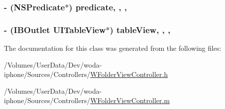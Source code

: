 \hypertarget{interface_w_folder_view_controller_aa3930e85f96ce1dd94f95cb3f78d529f}{
\subsubsection[{predicate}]{\setlength{\rightskip}{0pt plus 5cm}-\/ (N\-S\-Predicate$\ast$) predicate\hspace{0.3cm}{\ttfamily [read]}, {\ttfamily [write]}, {\ttfamily [nonatomic]}, {\ttfamily [retain]}}}\label{interface_w_folder_view_controller_aa3930e85f96ce1dd94f95cb3f78d529f}
\hypertarget{interface_w_folder_view_controller_a0f087f9ecbef58dabd499627304e1e75}{
\subsubsection[{table\-View}]{\setlength{\rightskip}{0pt plus 5cm}-\/ (I\-B\-Outlet U\-I\-Table\-View$\ast$) table\-View\hspace{0.3cm}{\ttfamily [read]}, {\ttfamily [write]}, {\ttfamily [nonatomic]}, {\ttfamily [retain]}}}\label{interface_w_folder_view_controller_a0f087f9ecbef58dabd499627304e1e75}


The documentation for this class was generated from the following files\-:\begin{DoxyCompactItemize}
\item 
/\-Volumes/\-User\-Data/\-Dev/woda-\/iphone/\-Sources/\-Controllers/\hyperlink{_w_folder_view_controller_8h}{W\-Folder\-View\-Controller.\-h}\item 
/\-Volumes/\-User\-Data/\-Dev/woda-\/iphone/\-Sources/\-Controllers/\hyperlink{_w_folder_view_controller_8m}{W\-Folder\-View\-Controller.\-m}\end{DoxyCompactItemize}
